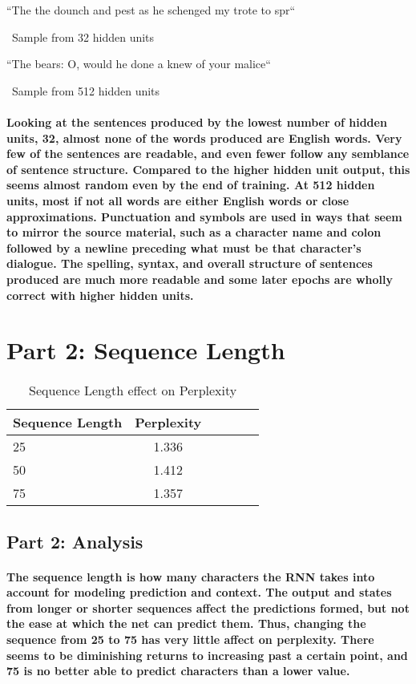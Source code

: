 \documentclass[10pt,a4paper]{report}
\begin{document}
``The the dounch and pest as he schenged my trote to spr``

\ 
Sample from 32 hidden units 
\vspace{5mm}

``The bears: O, would he done a knew of your malice``

\ 
Sample from 512 hidden units 
\

\paragraph{
Looking at the sentences produced by the lowest number of hidden units, 32, almost none of the words produced are English words. Very few of the sentences are readable, and even fewer follow any semblance of sentence structure. Compared to the higher hidden unit output, this seems almost random even by the end of training. At 512 hidden units, most if not all words are either English words or close approximations. Punctuation and symbols are used in ways that seem to mirror the source material, such as a character name and colon followed by a newline preceding what must be that character's dialogue. The spelling, syntax, and overall structure of sentences produced are much more readable and some later epochs are wholly correct with higher hidden units.
}

\clearpage

\section{Part 2: Sequence Length}

\begin{table}[h]
 \caption{Sequence Length effect on Perplexity}
 \label{tbl:bTable}
 \begin{center}
  \begin{tabular}{lccrrr}
    \hline 
	Sequence Length & Perplexity\\
	\hline
	25 & 1.336\\
	50 & 1.412\\
	75 & 1.357\\
  \end{tabular}
 \end{center}
\end{table}

\subsection{Part 2: Analysis}

\paragraph{
The sequence length is how many characters the RNN takes into account for modeling prediction and context. The output and states from longer or shorter sequences affect the predictions formed, but not the ease at which the net can predict them. Thus, changing the sequence from 25 to 75 has very little affect on perplexity. There seems to be diminishing returns to increasing past a certain point, and 75 is no better able to predict characters than a lower value.
}
\end{document}
